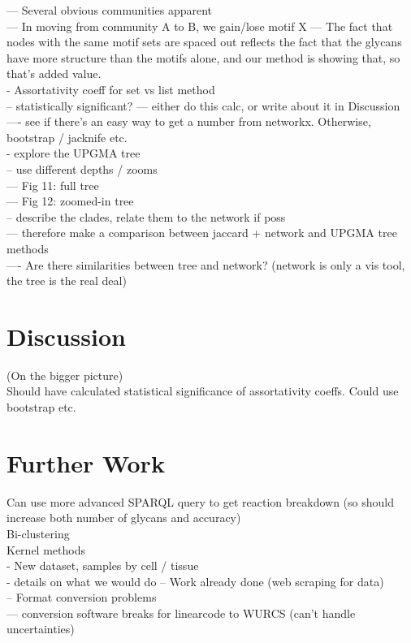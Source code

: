 \documentclass[12pt,a4paper]{article}
\begin{document}
--- Several obvious communities apparent\\
--- In moving from community A to B, we gain/lose motif X
--- The fact that nodes with the same motif sets are spaced out reflects the fact that the glycans have more structure than the motifs alone, and our method is showing that, so that's added value.\\

- Assortativity coeff for set vs list method\\
-- statistically significant?
--- either do this calc, or write about it in Discussion \\
---- see if there's an easy way to get a number from networkx. Otherwise, bootstrap / jacknife etc. \\

- explore the UPGMA tree\\
-- use different depths / zooms\\
--- Fig 11: full tree\\
--- Fig 12: zoomed-in tree\\
-- describe the clades, relate them to the network if poss\\
--- therefore make a comparison between jaccard + network and UPGMA tree methods\\
---- Are there similarities between tree and network? (network is only a vis tool, the tree is the real deal) \\

\newpage
\section{Discussion}
\label{sec:discussion}
(On the bigger picture)\\
Should have calculated statistical significance of assortativity coeffs. Could use bootstrap etc.

\newpage
\section{Further Work}
\label{sec:further_work}

Can use more advanced SPARQL query to get reaction breakdown (so should increase both number of glycans and accuracy)\\

Bi-clustering\\

Kernel methods\\

- New dataset, samples by cell / tissue\\
- details on what we would do
-- Work already done (web scraping for data)\\
-- Format conversion problems\\
--- conversion software breaks for linearcode to WURCS (can't handle uncertainties)\\
\end{document}
